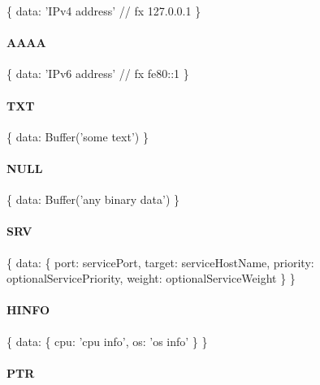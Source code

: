 \begin{DoxyCode}
\{
  data: 'IPv4 address' // fx 127.0.0.1
\}
\end{DoxyCode}


\paragraph*{{\ttfamily A\+A\+AA}}


\begin{DoxyCode}
\{
  data: 'IPv6 address' // fx fe80::1
\}
\end{DoxyCode}


\paragraph*{{\ttfamily T\+XT}}


\begin{DoxyCode}
\{
  data: Buffer('some text')
\}
\end{DoxyCode}


\paragraph*{{\ttfamily N\+U\+LL}}


\begin{DoxyCode}
\{
  data: Buffer('any binary data')
\}
\end{DoxyCode}


\paragraph*{{\ttfamily S\+RV}}


\begin{DoxyCode}
\{
  data: \{
    port: servicePort,
    target: serviceHostName,
    priority: optionalServicePriority,
    weight: optionalServiceWeight
  \}
\}
\end{DoxyCode}


\paragraph*{{\ttfamily H\+I\+N\+FO}}


\begin{DoxyCode}
\{
  data: \{
    cpu: 'cpu info',
    os: 'os info'
  \}
\}
\end{DoxyCode}


\paragraph*{{\ttfamily P\+TR}}


